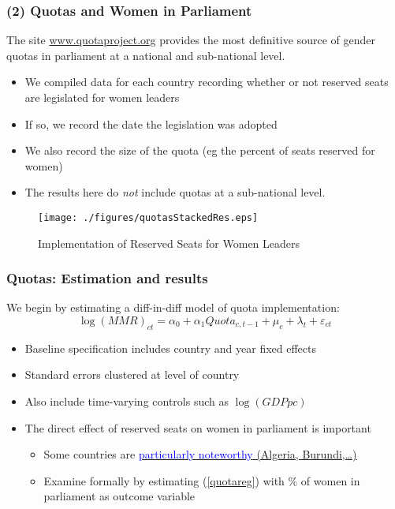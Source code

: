 \documentclass[10pt,letterpaper,subeqn]{beamer}
\begin{document}
\begin{frame}
\frametitle{(2) Quotas and Women in Parliament}
The site \url{www.quotaproject.org} provides the most definitive source of
gender quotas in parliament at a national and sub-national level. \vspace{5mm}
\begin{itemize}
\setlength{\itemsep}{10pt}
\item We compiled data for each country recording whether or
  not reserved seats are legislated for women leaders
\item If so, we record the date the legislation was adopted
\item We also record the size of the quota (eg the percent of seats reserved for
  women)
\item The results here do \emph{not} include quotas at a sub-national level.
\end{itemize}
\end{frame}

\begin{frame}[label=quotaDesc]
  \begin{figure}
    \caption{Implementation of Reserved Seats for Women Leaders}
    \texttt{[image: ./figures/quotasStackedRes.eps]}
  \end{figure}
\end{frame}


\begin{frame}[label=Quotas]
\frametitle{Quotas: Estimation and results}
We begin by estimating a diff-in-diff model of quota implementation:
\begin{equation}
  \label{quotareg}
\log(MMR)_{ct} = \alpha_0 + \alpha_1 Quota_{c,t-1} + \mu_c + \lambda_t + \varepsilon_{ct}  
\end{equation}
\vspace{4mm}
\begin{itemize}
\item Baseline specification includes country and year fixed effects
\item Standard errors clustered at level of country
\item Also include time-varying controls such as $\log(GDP pc)$
\item The direct effect of reserved seats on women in parliament is important
  \begin{itemize}
    \item Some countries are \hyperlink{quotaCover}{{\textcolor{blue}{particularly noteworthy} (Algeria, Burundi,\ldots)}} 
  \item Examine formally by estimating (\ref{quotareg}) with \% of women in parliament as outcome variable
  \end{itemize}
  \end{itemize}
\end{frame}
\end{document}
